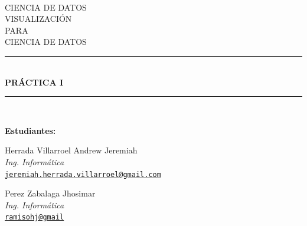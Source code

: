 \documentclass[12pt]{article}
\newcommand{\HRule}{\rule{\linewidth}{0.5mm}} %
\begin{document}
\begin{center}
    \begin{figure}
        \vspace{-1.0cm}
    \end{figure}
    \mbox{}\\[1.0cm]
    \textsc{\Huge CIENCIA DE DATOS}\\[3.0cm]
    \textsc{\LARGE VISUALIZACIÓN}\\[1.0cm]
    \textsc{\LARGE PARA}\\[1.0cm]
    \textsc{\LARGE CIENCIA DE DATOS}\\[3.0cm]
    \HRule\\[0.4cm]
    {\large \bf {PRÁCTICA I}}\\[0.2cm]
    \HRule\\[2.0cm]
\end{center}

\begin{flushleft}
    \textbf{Estudiantes:}
\end{flushleft}

\begin{center}
    \begin{minipage}{0.5\textwidth}
        \begin{center}            
            
            \begin{center}
            Herrada Villarroel Andrew Jeremiah\\
            \textit{Ing. Informática}\\
            \href{mailto:jeremiah.herrada.villarroel@gmail.com}{\texttt{jeremiah.herrada.villarroel@gmail.com}}
            \end{center}
            
			\begin{center}
			\end{center}	            
            
            \begin{center}
            Perez Zabalaga Jhosimar\\
            \textit{Ing. Informática}\\
            \href{mailto:ramisohj@gmail}{\texttt{ramisohj@gmail}}
            \end{center}
            
            \begin{center}
			\end{center}
            
        \end{center}
    \end{minipage}%
\end{center}
\end{document}

